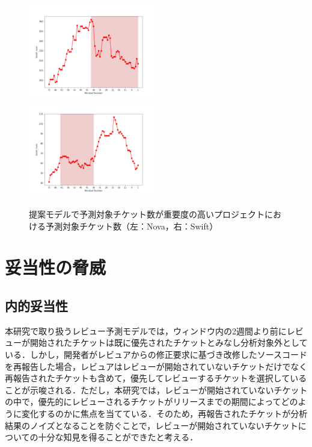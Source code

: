\documentclass[11pt]{jreport}
\begin{document}
\begin{figure}[H]
\begin{center}
    \includegraphics[width=0.495\textwidth]{Uenaka_fig/RQ2_kousatu/Nova_ticket_num.pdf}
    \includegraphics[width=0.495\textwidth]{Uenaka_fig/RQ2_kousatu/Swift_ticket_num_merge.pdf}
    \caption{提案モデルで予測対象チケット数が重要度の高いプロジェクトにおける予測対象チケット数（左：Nova，右：Swift）}
    \label{fig:merge_ticket_num}
\end{center}
\end{figure}


\chapter{妥当性の脅威}\label{sec:disc}

\section{内的妥当性}
本研究で取り扱うレビュー予測モデルでは，ウィンドウ内の2週間より前にレビューが開始されたチケットは既に優先されたチケットとみなし分析対象外としている．しかし，開発者がレビュアからの修正要求に基づき改修したソースコードを再報告した場合，レビュアはレビューが開始されていないチケットだけでなく再報告されたチケットも含めて，優先してレビューするチケットを選択していることが示唆される．ただし，本研究では，レビューが開始されていないチケットの中で，優先的にレビューされるチケットがリリースまでの期間によってどのように変化するのかに焦点を当てている．そのため，再報告されたチケットが分析結果のノイズとなることを防ぐことで，レビューが開始されていないチケットについての十分な知見を得ることができたと考える．
\end{document}

